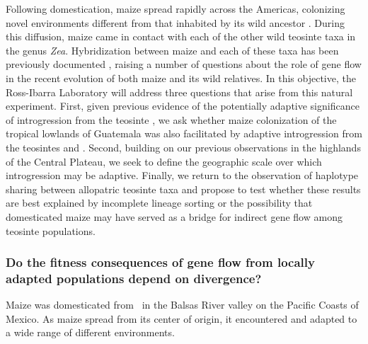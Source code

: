 Following domestication, maize spread rapidly across the Americas, colonizing novel environments different from that inhabited by its wild ancestor \zp. 
During this diffusion, maize came in contact with each of the other wild teosinte taxa in the genus \emph{Zea}.  
Hybridization between maize and each of these taxa has been previously documented \citep[see][for a review]{doebley1990molecular}, raising a number of questions about the role of gene flow in the recent evolution of both maize and its wild relatives.
In this objective, the Ross-Ibarra Laboratory  will address three questions that arise from this natural experiment.  
First, given previous evidence of the potentially adaptive significance of introgression from the teosinte \zm, we ask whether maize colonization of the tropical lowlands of Guatemala was also facilitated by adaptive introgression from the teosintes \zl{} and \zh.
Second, building on our previous observations in the highlands of the Central Plateau, we seek to define the geographic scale over which introgression may be adaptive.
Finally, we return to the observation of haplotype sharing between allopatric teosinte taxa \citep{Ross-Ibarra2009a} and propose to test whether these results are best explained by incomplete lineage sorting or the possibility that domesticated maize may have served as a bridge for indirect gene flow among teosinte populations. 

\subsubsection{Do the fitness consequences of gene flow from locally adapted populations depend on divergence?}
\label{sss:adaptive_intro}



Maize was domesticated from \zp\ in the Balsas River valley on the Pacific Coasts of Mexico.  
As maize spread from its center of origin, it encountered and adapted to a wide range of different environments.

